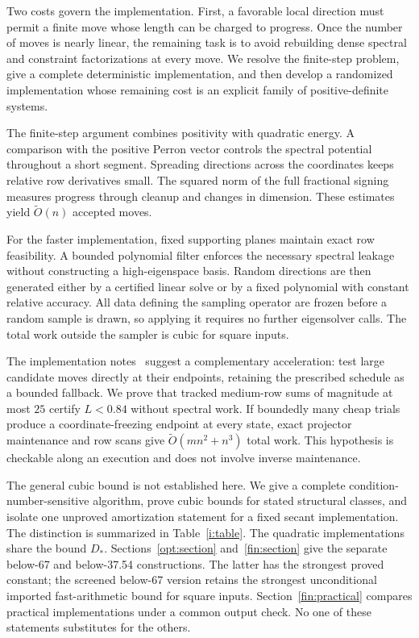 \documentclass[11pt]{amsart}
\theoremstyle{definition}\newtheorem{definition}[theorem]{Definition}
\theoremstyle{remark}\newtheorem{remark}[theorem]{Remark}
\numberwithin{equation}{section}
\begin{document}
Two costs govern the implementation. First, a favorable local direction
must permit a finite move whose length can be charged to progress. Once
the number of moves is nearly linear, the remaining task is to avoid
rebuilding dense spectral and constraint factorizations at every move. We resolve the
finite-step problem, give a complete deterministic implementation, and
then develop a randomized implementation whose remaining cost is an
explicit family of positive-definite systems.

The finite-step argument combines positivity with quadratic energy.
A comparison with the positive Perron vector controls the spectral
potential throughout a short segment. Spreading directions across the
coordinates keeps relative row derivatives small. The squared norm of
the full fractional signing measures progress through cleanup and
changes in dimension. These estimates yield $\widetilde O(n)$ accepted moves.

For the faster implementation, fixed supporting planes maintain exact
row feasibility. A bounded polynomial filter enforces the necessary
spectral leakage without constructing a high-eigenspace basis. Random
directions are then generated either by a certified linear solve or by
a fixed polynomial with constant relative accuracy. All data defining
the sampling operator are frozen before a random sample is drawn, so
applying it requires no further eigensolver calls. The total work outside
the sampler is cubic for square inputs.

The implementation notes~\cite{CertSteps,CertAnalysis} suggest a
complementary acceleration: test large candidate moves directly at their
endpoints, retaining the prescribed schedule as a bounded fallback.
We prove that tracked medium-row sums of magnitude at most $25$ certify
$L<0.84$ without spectral work. If boundedly many cheap trials produce a
coordinate-freezing endpoint at every state, exact projector maintenance
and row scans give $\widetilde O(mn^2+n^3)$ total work. This hypothesis
is checkable along an execution and does not involve inverse maintenance.

The general cubic bound is not established here. We give a complete
condition-number-sensitive algorithm, prove cubic bounds for stated
structural classes, and isolate one unproved amortization statement for a
fixed secant implementation. The distinction is summarized in
Table~\ref{i:table}. The quadratic implementations share the bound
$D_*$. Sections~\ref{opt:section} and~\ref{fin:section} give the separate
below-67 and below-37.54 constructions. The latter has the strongest
proved constant; the screened below-67 version retains the strongest
unconditional imported fast-arithmetic bound for square inputs.
Section~\ref{fin:practical} compares practical implementations under a
common output check. No one of these statements substitutes for the others.
\end{document}
